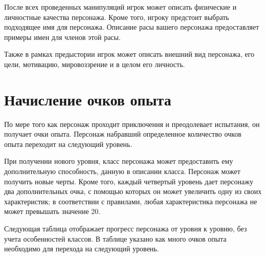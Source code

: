 После всех проведенных манипуляций игрок может описать физические и личностные качества персонажа. Кроме того, игроку предстоит выбрать подходящее имя для персонажа. Описание расы вашего персонажа предоставляет примеры имен для членов этой расы.

Также в рамках предыстории игрок может описать внешний вид персонажа, его цели, мотивацию, мировоззрение и в целом его личность.

\section{Начисление очков опыта}

По мере того как персонаж проходит приключения и преодолевает испытания, он получает очки опыта. Персонаж набравший определенное количество очков опыта переходит на следующий уровень.

При получении нового уровня, класс персонажа может предоставить ему дополнительную способность, данную в описании класса. Персонаж может получить новые черты. Кроме того, каждый четвертый уровень дает персонажу два дополнительных очка, с помощью которых он может увеличить одну из своих характеристик; в соответствии с правилами, любая характеристика персонажа не может превышать значение 20.

Следующая таблица отображает прогресс персонажа от уровня к уровню, без учета особенностей классов. В таблице указано как много очков опыта необходимо для перехода на следующий уровень.

